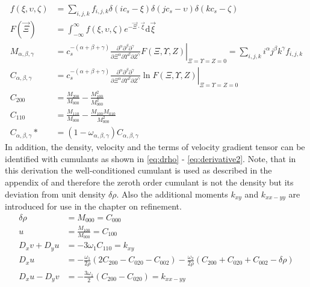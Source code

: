 \begin{align}
f(\xi, \upsilon, \zeta) &= \sum_{i,j,k} f_{i,j,k} \delta(ic_s - \xi) \delta(jc_s - \upsilon) \delta(kc_s - \zeta) \label{eq:contin}\\
F(\vec{\Xi}) &= \int_{-\infty}^{\infty}f(\xi, \upsilon, \zeta)e^{-\vec{\Xi} \cdot \vec{\xi}} \mathrm{d}\vec{\xi} \label{eq:cum_laplace} \\
M_{\alpha, \beta, \gamma} &= c_s^{-(\alpha+\beta+\gamma)} \left. \frac{\partial^\alpha \partial^\beta \partial^\gamma}{\partial \Xi^\alpha \partial \Upsilon^\beta \partial Z^\gamma} F(\Xi, \Upsilon, Z) \right|_{\Xi=\Upsilon=Z=0} = \sum_{i,j,k} i^\alpha j^\beta k^\gamma f_{i,j,k} \label{eq:moments}\\
C_{\alpha,\beta,\gamma} &= c_s^{-(\alpha+\beta+\gamma)} \left. \frac{\partial^\alpha \partial^\beta \partial^\gamma}{\partial \Xi^\alpha \partial \Upsilon^\beta \partial Z^\gamma} \ln F(\Xi, \Upsilon, Z)\right|_{\Xi=\Upsilon=Z=0} \label{eq:cum} \\
C_{200} &= \frac{M_{200}}{M_{000}} - \frac{M_{100}^2}{M_{000}^2} \label{eq:c_200}\\
C_{110} &= \frac{M_{110}}{M_{000}} - \frac{M_{100} M_{010}}{M_{000}^2} \label{eq:c_110} \\
C_{\alpha, \beta, \gamma}* &= \left(1-\omega_{\alpha,\beta,\gamma}\right) C_{\alpha, \beta, \gamma} \label{eq:relax}
\end{align}
In addition, the density, velocity and the terms of velocity gradient tensor can be identified with cumulants as shown in \eqref{eq:drho} - \eqref{eq:derivative2}. Note, that in this derivation the well-conditioned cumulant is used as described in the appendix of \cite{geier_cumulant_2015} and therefore the zeroth order cumulant is not the density but its deviation from unit density $\delta \rho$. Also the additional moments $k_{xy}$ and $k_{xx-yy}$ are introduced for use in the chapter on refinement.
\begin{align}
\delta \rho &= M_{000} = C_{000} \label{eq:drho}\\
u &= \frac{M_{100}}{M_{000}} =  C_{100}\\
D_x v + D_y u &= -3 \omega_1 C_{110} = k_{xy} \label{eq:derivate1}\\
D_x u &= - \frac{\omega_1}{2 \rho}\left(2 C_{200} - C_{020} - C_{002} \right) - \frac{\omega_2}{2 \rho} \left(C_{200} + C_{020} + C_{002} - \delta \rho \right) \\
D_x u - D_y v &= - \frac{3\omega_1}{2} \left(C_{200} - C_{020}\right) = k_{xx-yy}\label{eq:derivative2}
\end{align}
